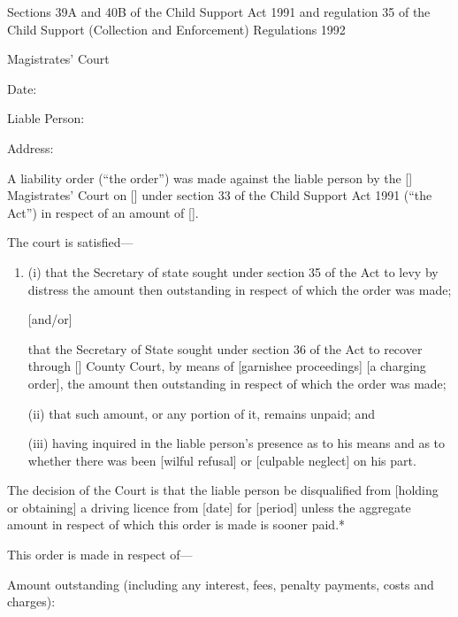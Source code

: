 \documentclass[12pt,a4paper]{article}
\begin{document}
\medskip

\noindent
Sections 39A and 40B of the Child Support Act 1991 and regulation 35 of the Child Support (Collection and Enforcement) Regulations 1992

\medskip

{\raggedleft \hspace{0.5\linewidth}\dotfill Magistrates' Court

}

\medskip

Date:

\medskip

Liable Person:

\medskip

Address:

\medskip

A liability order (``the order'') was made against the liable person by the [\phantom{Bolton}] Magistrates' Court on [\phantom{\today}] under section 33 of the Child Support Act 1991 (``the Act'') in respect of an amount of [\phantom{£100.00}].

The court is satisfied---
\begin{enumerate}
\item[]
(i) that the Secretary of state sought under section 35 of the Act to levy by distress the amount then outstanding in respect of which the order was made;

[and/or]

that the Secretary of State sought under section 36 of the Act to recover through [\phantom{Bolton}] County Court, by means of [garnishee proceedings] [a charging order], the amount then outstanding in respect of which the order was made;

(ii) that such amount, or any portion of it, remains unpaid; and

(iii) having inquired in the liable person's presence as to his means and as to whether there was been [wilful refusal] or [culpable neglect] on his part.
\end{enumerate}

The decision of the Court is that the liable person be disqualified from [holding or obtaining] a driving licence from [date] for [period] unless the aggregate amount in respect of which this order is made is sooner paid.*

\medskip

This order is made in respect of---

Amount outstanding (including any interest, fees, penalty payments, costs and charges):
\end{document}

